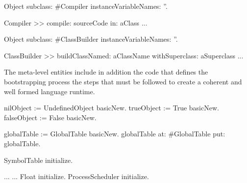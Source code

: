 \begin{code}
Object subclass: #Compiler
    instanceVariableNames: ''.

Compiler >> compile: sourceCode in: aClass
    ...
    
Object subclass: #ClassBuilder
    instanceVariableNames: ''.
    
ClassBuilder >> buildClassNamed: aClassName withSuperclass: aSuperclass
    ...
\end{code}

The meta-level entities include in addition the code that defines the bootstrapping process \ie the steps that must be followed to create a coherent and well formed language runtime.

\begin{code}
nilObject := UndefinedObject basicNew.
trueObject := True basicNew.
falseObject := False basicNew.

globalTable := GlobalTable basicNew.
globalTable
    at: #GlobalTable
    put: globalTable.
    
SymbolTable initialize.

...
...
Float initialize.
ProcessScheduler initialize.
\end{code}


%

%


